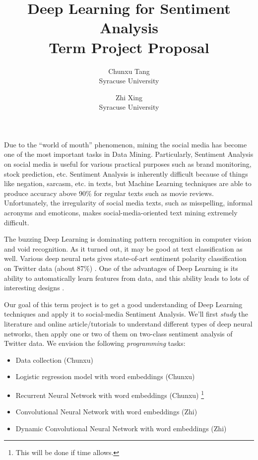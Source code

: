 \documentclass[11pt, letterpaper]{article}
\begin{document}
\title{Deep Learning for Sentiment Analysis\\
Term Project Proposal}
\author{Chunxu Tang\\ 
Syracuse University
\and
Zhi Xing\\ 
Syracuse University}
\date{}
\maketitle

Due to the ``world of mouth'' phenomenon, mining the social media has become one of the most important tasks in Data Mining. Particularly, Sentiment Analysis on social media is useful for various practical purposes such as brand monitoring, stock prediction, etc. 
Sentiment Analysis is inherently difficult because of things like negation, sarcasm, etc. in texts, but Machine Learning techniques are able to produce accuracy above 90\% for regular texts such as movie reviews. Unfortunately, the irregularity of social media texts, such as misspelling, informal acronyms and emoticons, makes social-media-oriented text mining extremely difficult. 

The buzzing Deep Learning is dominating pattern recognition in computer vision and void recognition. As it turned out, it may be good at text classification as well. Various deep neural nets gives state-of-art sentiment polarity classification on Twitter data (about 87\%)\cite{kalchbrenner2014} \cite{kim2014} \cite{wang2015}. One of the advantages of Deep Learning is its ability to automatically learn features from data, and this ability leads to lots of interesting designs \cite{dos2014} \cite{kalchbrenner2014} \cite{kim2014} \cite{socher2013} \cite{wang2015}.

Our goal of this term project is to get a good understanding of Deep Learning techniques and apply it to social-media Sentiment Analysis. We'll first {\em study} the literature and online article/tutorials to understand different types of deep neural networks, then apply one or two of them on two-class sentiment analysis of Twitter data. We envision the following {\em programming} tasks:
\begin{itemize}
\item Data collection (Chunxu)
\item Logistic regression model with word embeddings (Chunxu)
\item Recurrent Neural Network with word embeddings (Chunxu) \footnote{\label{ext}This will be done if time allows.}
\item Convolutional Neural Network with word embeddings (Zhi)
\item Dynamic Convolutional Neural Network with word embeddings (Zhi) 
\end{itemize}

\nocite{*}
{\fontsize{9pt}{10pt}\selectfont


}
\end{document}
